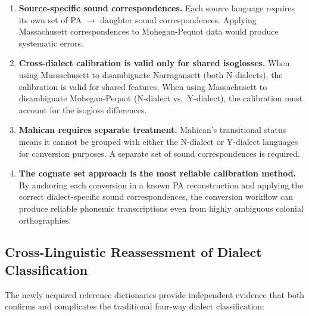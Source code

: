 \begin{enumerate}
  \item \textbf{Source-specific sound correspondences.} Each source language
    requires its own set of PA $\rightarrow$ daughter sound correspondences.
    Applying Massachusett correspondences to Mohegan-Pequot data would
    produce systematic errors.

  \item \textbf{Cross-dialect calibration is valid only for shared
    isoglosses.} When using Massachusett to disambiguate Narragansett (both
    N-dialects), the calibration is valid for shared features. When using
    Massachusett to disambiguate Mohegan-Pequot (N-dialect vs.\ Y-dialect),
    the calibration must account for the isogloss differences.

  \item \textbf{Mahican requires separate treatment.} Mahican's transitional
    status means it cannot be grouped with either the N-dialect or Y-dialect
    languages for conversion purposes. A separate set of sound
    correspondences is required.

  \item \textbf{The cognate set approach is the most reliable calibration
    method.} By anchoring each conversion in a known PA reconstruction and
    applying the correct dialect-specific sound correspondences, the
    conversion workflow can produce reliable phonemic transcriptions even
    from highly ambiguous colonial orthographies.
\end{enumerate}

\subsection{Cross-Linguistic Reassessment of Dialect Classification}

The newly acquired reference dictionaries provide independent evidence that
both confirms and complicates the traditional four-way dialect classification:

